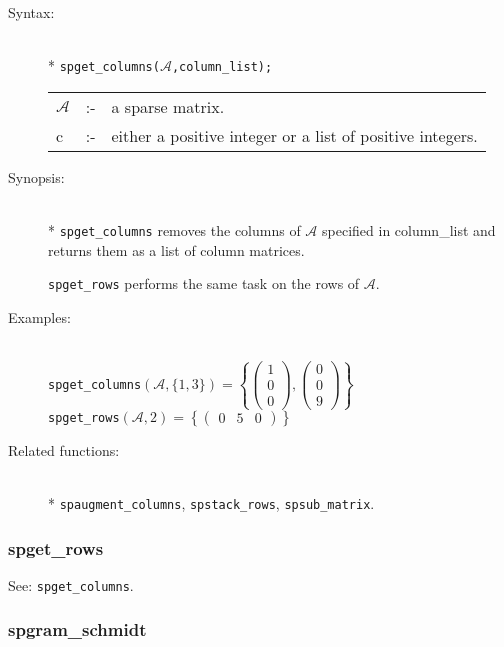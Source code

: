 \begin{description}
\item[Syntax:]\mbox{}\\*
\texttt{spget\_columns($\mathcal{A}$,column\_list);}\\[2mm]
\begin{tabular}{l l l}
$\mathcal{A}$ &:-& a sparse matrix. \\
c          &:-& either a positive integer or a list of positive
                integers.
\end{tabular}

\item[Synopsis:]\mbox{}\\*
\texttt{spget\_columns} removes the columns of $\mathcal{A}$ specified in
                column\_list and returns them as a list of column
                matrices.

 \texttt{spget\_rows} performs the same task on the rows of
                $\mathcal{A}$.

\item[Examples:]\mbox{}\\
\texttt{spget\_columns}\((\mathcal{A},\{1,3\})  =
\left\{
        \begin{pmatrix} 1 \\ 0 \\ 0 \end{pmatrix},
        \begin{pmatrix} 0 \\ 0 \\ 9 \end{pmatrix}
\right\}\) \\[2mm]
\texttt{spget\_rows}\((\mathcal{A},2) =
\left\{
        \begin{pmatrix} 0 & 5 & 0 \end{pmatrix}
\right\}\)

\item[Related functions:]\mbox{}\\*
\texttt{spaugment\_columns}, \texttt{spstack\_rows},
\texttt{spsub\_matrix}.

\end{description}

\subsubsection{spget\_rows}
\label{sparse:spget_rows}
See: \texttt{spget\_columns}.


\subsubsection{spgram\_schmidt}
\label{sparse:spgram_schmidt}

